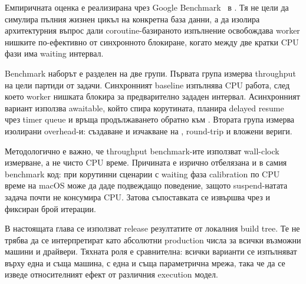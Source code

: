 Емпиричната оценка е реализирана чрез Google Benchmark~\cite{google_benchmark_user_guide} в . Тя не цели да симулира пълния жизнен цикъл на конкретна база данни, а да изолира архитектурния въпрос дали coroutine-базираното изпълнение освобождава worker нишките по-ефективно от синхронното блокиране, когато между две кратки CPU фази има waiting интервал.

Benchmark наборът е разделен на две групи. Първата група измерва throughput на цели партиди от задачи. Синхронният baseline изпълнява CPU работа, след което worker нишката блокира за предварително зададен интервал. Асинхронният вариант използва  awaitable, който спира корутината, планира delayed resume чрез timer queue и връща продължаването обратно към . Втората група измерва изолирани overhead-и: създаване и изчакване на ,  round-trip и вложени  вериги.

Методологично е важно, че throughput benchmark-ите използват wall-clock измерване, а не чисто CPU време. Причината е изрично отбелязана и в самия benchmark код: при корутинни сценарии с waiting фаза calibration по CPU време на macOS може да даде подвеждащо поведение, защото suspend-натата задача почти не консумира CPU. Затова съпоставката се извършва чрез  и фиксиран брой итерации.

В настоящата глава се използват release резултатите от локалния  build tree. Те не трябва да се интерпретират като абсолютни production числа за всички възможни машини и драйвери. Тяхната роля е сравнителна: всички варианти се изпълняват върху една и съща машина, с една и съща параметрична мрежа, така че да се изведе относителният ефект от различния execution модел.

